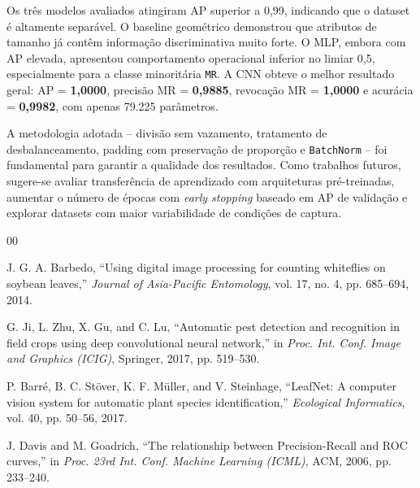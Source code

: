 \documentclass[conference]{IEEEtran}
\begin{document}
Os três modelos avaliados atingiram AP superior a 0,99, indicando que
o dataset é altamente separável. O baseline geométrico demonstrou que
atributos de tamanho já contêm informação discriminativa muito forte.
O MLP, embora com AP elevada, apresentou comportamento operacional
inferior no limiar 0,5, especialmente para a classe minoritária
\texttt{MR}. A CNN obteve o melhor resultado geral:
AP = \textbf{1,0000}, precisão MR = \textbf{0,9885},
revocação MR = \textbf{1,0000} e acurácia = \textbf{0,9982},
com apenas 79.225 parâmetros.

A metodologia adotada -- divisão sem vazamento, tratamento de
desbalanceamento, padding com preservação de proporção e
\texttt{BatchNorm} -- foi fundamental para garantir a qualidade dos
resultados. Como trabalhos futuros, sugere-se avaliar transferência
de aprendizado com arquiteturas pré-treinadas, aumentar o número de
épocas com \textit{early stopping} baseado em AP de validação e
explorar datasets com maior variabilidade de condições de captura.

\begin{thebibliography}{00}

J. G. A. Barbedo,
``Using digital image processing for counting whiteflies on soybean leaves,''
\textit{Journal of Asia-Pacific Entomology}, vol. 17, no. 4,
pp. 685--694, 2014.

G. Ji, L. Zhu, X. Gu, and C. Lu,
``Automatic pest detection and recognition in field crops using deep
convolutional neural network,''
in \textit{Proc. Int. Conf. Image and Graphics (ICIG)},
Springer, 2017, pp. 519--530.

P. Barré, B. C. Stöver, K. F. Müller, and V. Steinhage,
``LeafNet: A computer vision system for automatic plant species
identification,''
\textit{Ecological Informatics}, vol. 40, pp. 50--56, 2017.

J. Davis and M. Goadrich,
``The relationship between Precision-Recall and ROC curves,''
in \textit{Proc. 23rd Int. Conf. Machine Learning (ICML)},
ACM, 2006, pp. 233--240.

\end{thebibliography}
\end{document}
